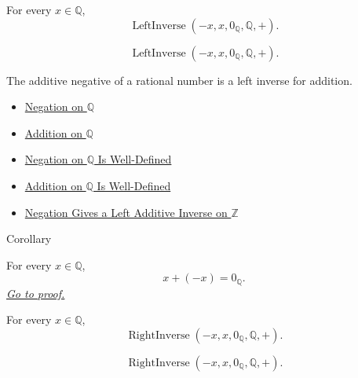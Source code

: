 \begin{remark*}
For every $x\in\mathbb{Q}$,
\[
\operatorname{LeftInverse}(-x,x,0_{\mathbb{Q}},\mathbb{Q},+).
\]
\end{remark*}

\begin{remark*}
\[
\operatorname{LeftInverse}(-x,x,0_{\mathbb{Q}},\mathbb{Q},+).
\]
\end{remark*}

\begin{remark*}[Interpretation]
The additive negative of a rational number is a left inverse for addition.
\end{remark*}

\begin{dependencies}
\begin{itemize}
  \item \hyperref[def:negation-on-q-classes]{Negation on $\mathbb{Q}$}
  \item \hyperref[def:addition-on-q-classes]{Addition on $\mathbb{Q}$}
  \item \hyperref[thm:negation-on-q-well-defined]{Negation on $\mathbb{Q}$ Is Well-Defined}
  \item \hyperref[thm:addition-on-q-well-defined]{Addition on $\mathbb{Q}$ Is Well-Defined}
  \item \hyperref[thm:negation-left-additive-inverse-on-z]{Negation Gives a
 Left Additive Inverse on $\mathbb{Z}$}
\end{itemize}
\end{dependencies}

\begin{corollarybox}{Corollary}
\begin{corollary}
\label{cor:negation-right-additive-inverse-on-q}
For every $x\in\mathbb{Q}$,
\[
x+(-x)=0_{\mathbb{Q}}.
\]
\hyperref[prf:negation-right-additive-inverse-on-q]{\textit{Go to proof.}}
\end{corollary}
\end{corollarybox}

\begin{remark*}
For every $x\in\mathbb{Q}$,
\[
\operatorname{RightInverse}(-x,x,0_{\mathbb{Q}},\mathbb{Q},+).
\]
\end{remark*}

\begin{remark*}
\[
\operatorname{RightInverse}(-x,x,0_{\mathbb{Q}},\mathbb{Q},+).
\]
\end{remark*}

